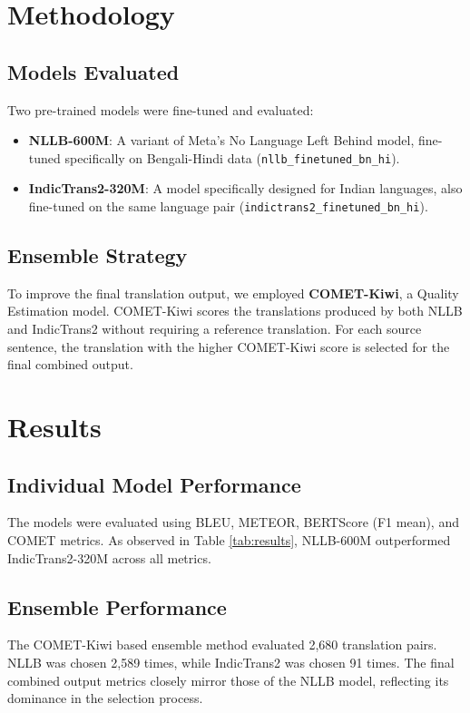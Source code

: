 \documentclass[12pt,a4paper]{report}
\begin{document}
\chapter{Methodology}

\section{Models Evaluated}
Two pre-trained models were fine-tuned and evaluated:
\begin{itemize}
    \item \textbf{NLLB-600M}: A variant of Meta's No Language Left Behind model, fine-tuned specifically on Bengali-Hindi data (\texttt{nllb\_finetuned\_bn\_hi}).
    \item \textbf{IndicTrans2-320M}: A model specifically designed for Indian languages, also fine-tuned on the same language pair (\texttt{indictrans2\_finetuned\_bn\_hi}).
\end{itemize}

\section{Ensemble Strategy}
To improve the final translation output, we employed \textbf{COMET-Kiwi}, a Quality Estimation model. COMET-Kiwi scores the translations produced by both NLLB and IndicTrans2 without requiring a reference translation. For each source sentence, the translation with the higher COMET-Kiwi score is selected for the final combined output.

\chapter{Results}

\section{Individual Model Performance}
The models were evaluated using BLEU, METEOR, BERTScore (F1 mean), and COMET metrics. As observed in Table \ref{tab:results}, NLLB-600M outperformed IndicTrans2-320M across all metrics. 

\section{Ensemble Performance}
The COMET-Kiwi based ensemble method evaluated 2,680 translation pairs. NLLB was chosen 2,589 times, while IndicTrans2 was chosen 91 times. The final combined output metrics closely mirror those of the NLLB model, reflecting its dominance in the selection process.
\end{document}
